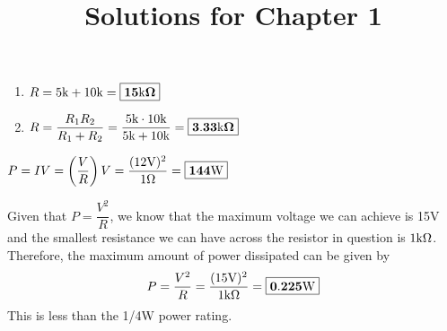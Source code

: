 \documentclass{article}
\begin{document}
\title{Solutions for Chapter 1}
    \begin{enumerate}
        \item 
        $R = 5\text{k} + 10\text{k} = \boxed{\mathbf{15\text{k}\Omega}}$

        \item 
        $R = \dfrac{R_1 R_2}{R_1 + R_2} = \dfrac{5\text{k} \cdot 10\text{k}}{5\text{k} + 10\text{k}} = \boxed{\mathbf{3.33\text{k}\Omega}}$

    \end{enumerate}

    $P = IV = \left(\dfrac{V}{R}\right)V = \dfrac{(12\text{V})^2}{1\Omega} = \boxed{\mathbf{144\text{W}}}$



    Given that $P = \dfrac{V^2}{R}$, we know that the maximum voltage we can achieve is 15V and the smallest resistance we can have across the resistor in question is $1\text{k}\Omega$. Therefore, the maximum amount of power dissipated can be given by \[P = \frac{V^2}{R} = \frac{(15\text{V})^2}{1\text{k}\Omega} = \boxed{\mathbf{0.225\text{W}}}\]
    This is less than the 1/4W power rating.
\end{document}

